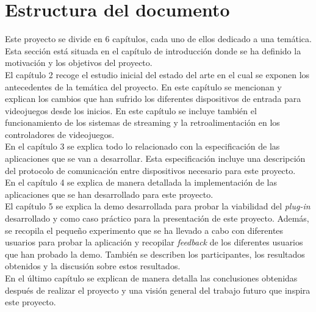\section{Estructura del documento}

Este proyecto se divide en 6 cap\'itulos, cada uno de ellos dedicado a una tem\'atica. Esta secci\'on est\'a situada en el cap\'itulo de introducci\'on donde se ha definido la motivaci\'on y los objetivos del proyecto.\\

El cap\'itulo 2 recoge el estudio inicial del estado del arte en el cual se exponen los antecedentes de la tem\'atica del proyecto. En este cap\'itulo se mencionan y explican los cambios que han sufrido los diferentes dispositivos de entrada para videojuegos desde los inicios. En este cap\'itulo se incluye tambi\'en el funcionamiento de los sistemas de streaming y la retroalimentaci\'on en los controladores de videojuegos.\\

En el cap\'itulo 3 se explica todo lo relacionado con la especificaci\'on de las aplicaciones que se van a desarrollar. Esta especificaci\'on incluye una descripci\'on del protocolo de comunicaci\'on entre dispositivos necesario para este proyecto.\\

En el cap\'itulo 4 se explica de manera detallada la implementaci\'on de las aplicaciones que se han desarrollado para este proyecto.\\

El cap\'itulo 5 se explica la demo desarrollada para probar la viabilidad del \textit{plug-in} desarrollado y como caso pr\'actico para la presentaci\'on de este proyecto. Adem\'as, se recopila el peque\~no experimento que se ha llevado a cabo con diferentes usuarios para probar la aplicaci\'on y recopilar \textit{feedback} de los diferentes usuarios que han probado la demo. Tambi\'en se describen los participantes, los resultados obtenidos y la discusi\'on sobre estos resultados.\\

En el \'ultimo cap\'itulo se explican de manera detalla las conclusiones obtenidas despu\'es de realizar el proyecto y una visi\'on general del trabajo futuro que inspira este proyecto.






